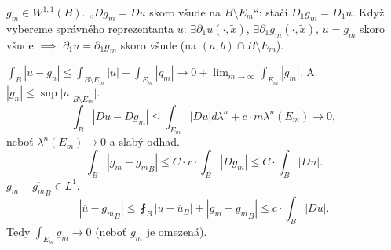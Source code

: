 \documentclass[12pt]{article}					%
\begin{document}
\begin{veta}
\begin{dukazin}
		$g_m \in W^{1, 1}(B)$. „$Dg_m = Du$ skoro všude na $B \setminus E_m$“: stačí $D_1g_m = D_1u$. Když vybereme správného reprezentanta $u$: $\exists \partial_1 u(·, \tilde x)$, $\exists \partial_1 g_m(·, \tilde x)$, $u = g_m$ skoro všude $\implies$ $\partial_1 u = \partial_1 g_m$ skoro všude (na $(a, b) \cap B \setminus E_m$).

		$\int_B |u - g_n| ≤ \int_{B \setminus E_m} |u| + \int_{E_m} |g_m| \rightarrow 0 + \lim_{m \rightarrow ∞} \int_{E_m} |g_m|$. A $|g_n| ≤ \sup |u|_{B \setminus E_m}|$.
		$$ \int_B |Du - Dg_m| ≤ \int_{E_m} |Du| dλ^n + c·m λ^n(E_m) \rightarrow 0, $$
		neboť $λ^n(E_m) \rightarrow 0$ a slabý odhad.
		$$ \int_B |g_m - \overline{g_m}_B| ≤ C·r·\int_B |D g_m| ≤ C·\int_B |Du|. $$
		$g_m - \overline{g_m}_B \in L^1$.
		$$ |\overline u - \overline{g_m}_B| ≤ \fint_B |u - \overline u_B| + |g_m - \overline{g_m}_B| ≤ c·\int_B |Du|. $$
		Tedy $\int_{E_m} g_m \rightarrow 0$ (neboť $g_m$ je omezená).
	\end{dukazin}
\end{veta}
\end{document}

